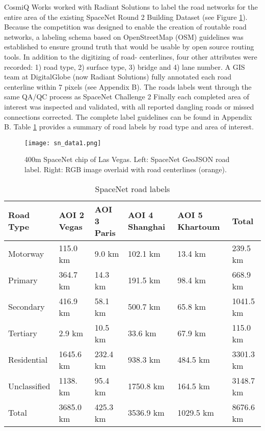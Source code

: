 \documentclass{article}
\begin{document}
CosmiQ Works worked with Radiant Solutions to label the road networks for the entire area of the existing SpaceNet Round 2 Building Dataset (see Figure \ref{fig:sn_data1}). Because the competition was designed to enable the creation of routable road networks, a labeling schema based on OpenStreetMap (OSM) guidelines was established to ensure ground truth that would be usable by open source routing tools. In addition to the digitizing of road- centerlines, four other attributes were recorded: 1) road type, 2) surface type, 3) bridge and 4) lane number. 
	 A GIS team at DigitalGlobe (now Radiant Solutions) fully annotated each road centerline within 7 pixels (see Appendix B). The roads labels went through the same QA/QC process as SpaceNet Challenge 2
	 Finally each completed area of interest was inspected and validated, with all reported dangling roads or missed connections corrected. The complete label guidelines can be found in Appendix B. Table \ref{tab:road_labels} provides a summary of road labels by road type and area of interest.

\begin{figure}
  \centering
     \texttt{[image: sn\_data1.png]}
  \caption{400m SpaceNet chip of Las Vegas.  Left: SpaceNet GeoJSON road label. Right: RGB image overlaid with road centerlines (orange).}
  \label{fig:sn_data1}
\end{figure}



\begin{table}
  \caption{SpaceNet road labels}
  \label{tab:road_labels}
  \centering
   \begin{tabular}{llllll}
    \toprule
Road Type & AOI 2 Vegas & AOI 3 Paris & AOI 4 Shanghai & AOI 5 Khartoum & Total \\
\toprule
Motorway & 115.0 km & 9.0 km & 102.1 km & 13.4 km & 239.5 km \\
Primary & 364.7 km & 14.3 km & 191.5 km & 98.4 km & 668.9 km \\
Secondary & 416.9 km & 58.1 km & 500.7 km & 65.8 km & 1041.5 km \\
Tertiary & 2.9 km & 10.5 km & 33.6 km & 67.9 km & 115.0 km \\
Residential & 1645.6 km & 232.4 km & 938.3 km & 484.5 km & 3301.3 km \\
Unclassified & 1138. km & 95.4 km & 1750.8 km & 164.5 km & 3148.7 km \\
\toprule
Total & 3685.0 km & 425.3 km & 3536.9 km & 1029.5 km & 8676.6 km \\
     
    \bottomrule
  \end{tabular}
\end{table}
\end{document}
